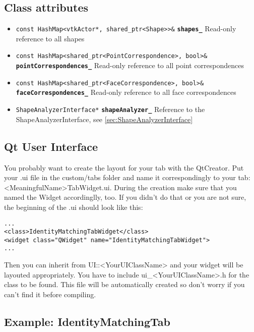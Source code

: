 \subsection{Class attributes}
\begin{itemize}
	\item \texttt{const HashMap<vtkActor*, shared\_ptr<Shape>>\&} \textbf{\texttt{shapes\_}} Read-only reference to all shapes
	\item \texttt{const HashMap<shared\_ptr<PointCorrespondence>, bool>\&} \textbf{\texttt{pointCorrespondences\_}} Read-only reference to all point correspondences
	\item \texttt{const HashMap<shared\_ptr<FaceCorrespondence>, bool>\&} \textbf{\texttt{faceCorrespondences\_}} Read-only reference to all face correspondences
	\item \texttt{ShapeAnalyzerInterface*} \textbf{\texttt{shapeAnalyzer\_}} Reference to the ShapeAnalyzerInterface, see \ref{sec:ShapeAnalyzerInterface}
\end{itemize}

\subsection{Qt User Interface}
\label{subsec:QtUI}

You probably want to create the layout for your tab with the QtCreator. Put your .ui file in the custom/tabs folder and name it correspondingly to your tab: <MeaningfulName>TabWidget.ui. During the creation make sure that you named the Widget accordinglly, too. If you didn't do that or you are not sure, the beginning of the .ui should look like this: 

\begin{lstlisting}[style=lstStyleCpp, caption={IdentityMatchingTabWidget.ui}]
...
<class>IdentityMatchingTabWidget</class>
<widget class="QWidget" name="IdentityMatchingTabWidget">
...
\end{lstlisting}

Then you can inherit from UI::<YourUIClassName> and your widget will be layouted appropriately. You have to include ui\_<YourUIClassName>.h for the class to be found. This file will be automatically created so don't worry if you can't find it before compiling. 


\subsection{Example: IdentityMatchingTab}
\label{subsec:ExampleIdentityMatchingTab}

